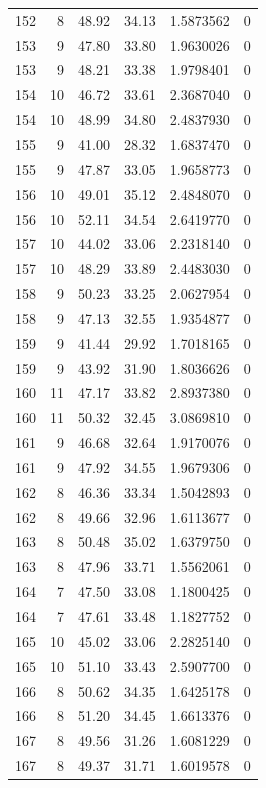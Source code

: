 \documentclass[
  letterpaper,
  DIV=11,
  numbers=noendperiod]{scrreprt}
\renewcommand{\[}{\begin{equation}}
\renewcommand{\]}{\end{equation}}
\begin{document}
\begin{table}
\begin{tabular*}{\linewidth}{@{\extracolsep{\fill}}rrrrrr}
152 & 8 & 48.92 & 34.13 & 1.5873562 & 0 \\ 
153 & 9 & 47.80 & 33.80 & 1.9630026 & 0 \\ 
153 & 9 & 48.21 & 33.38 & 1.9798401 & 0 \\ 
154 & 10 & 46.72 & 33.61 & 2.3687040 & 0 \\ 
154 & 10 & 48.99 & 34.80 & 2.4837930 & 0 \\ 
155 & 9 & 41.00 & 28.32 & 1.6837470 & 0 \\ 
155 & 9 & 47.87 & 33.05 & 1.9658773 & 0 \\ 
156 & 10 & 49.01 & 35.12 & 2.4848070 & 0 \\ 
156 & 10 & 52.11 & 34.54 & 2.6419770 & 0 \\ 
157 & 10 & 44.02 & 33.06 & 2.2318140 & 0 \\ 
157 & 10 & 48.29 & 33.89 & 2.4483030 & 0 \\ 
158 & 9 & 50.23 & 33.25 & 2.0627954 & 0 \\ 
158 & 9 & 47.13 & 32.55 & 1.9354877 & 0 \\ 
159 & 9 & 41.44 & 29.92 & 1.7018165 & 0 \\ 
159 & 9 & 43.92 & 31.90 & 1.8036626 & 0 \\ 
160 & 11 & 47.17 & 33.82 & 2.8937380 & 0 \\ 
160 & 11 & 50.32 & 32.45 & 3.0869810 & 0 \\ 
161 & 9 & 46.68 & 32.64 & 1.9170076 & 0 \\ 
161 & 9 & 47.92 & 34.55 & 1.9679306 & 0 \\ 
162 & 8 & 46.36 & 33.34 & 1.5042893 & 0 \\ 
162 & 8 & 49.66 & 32.96 & 1.6113677 & 0 \\ 
163 & 8 & 50.48 & 35.02 & 1.6379750 & 0 \\ 
163 & 8 & 47.96 & 33.71 & 1.5562061 & 0 \\ 
164 & 7 & 47.50 & 33.08 & 1.1800425 & 0 \\ 
164 & 7 & 47.61 & 33.48 & 1.1827752 & 0 \\ 
165 & 10 & 45.02 & 33.06 & 2.2825140 & 0 \\ 
165 & 10 & 51.10 & 33.43 & 2.5907700 & 0 \\ 
166 & 8 & 50.62 & 34.35 & 1.6425178 & 0 \\ 
166 & 8 & 51.20 & 34.45 & 1.6613376 & 0 \\ 
167 & 8 & 49.56 & 31.26 & 1.6081229 & 0 \\ 
167 & 8 & 49.37 & 31.71 & 1.6019578 & 0 \\ 

\end{tabular*}
\end{table}
\end{document}
